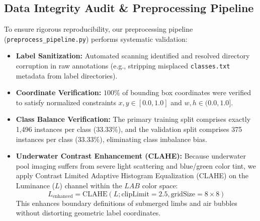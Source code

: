 \documentclass[a4paper,11pt]{article}
\begin{document}
\begin{table}[htbp]
\centering
\caption{Summary of Datasets and Surveillance Benchmark Scenarios}
\label{tab:datasets}
\end{table}

\subsection{Data Integrity Audit \& Preprocessing Pipeline}
To ensure rigorous reproducibility, our preprocessing pipeline (\texttt{preprocess\_pipeline.py}) performs systematic validation:
\begin{itemize}
    \item \textbf{Label Sanitization:} Automated scanning identified and resolved directory corruption in raw annotations (e.g., stripping misplaced \texttt{classes.txt} metadata from label directories).
    \item \textbf{Coordinate Verification:} $100\%$ of bounding box coordinates were verified to satisfy normalized constraints $x, y \in [0.0, 1.0]$ and $w, h \in (0.0, 1.0]$.
    \item \textbf{Class Balance Verification:} The primary training split comprises exactly 1,496 instances per class ($33.33\%$), and the validation split comprises 375 instances per class ($33.33\%$), eliminating class imbalance bias.
    \item \textbf{Underwater Contrast Enhancement (CLAHE):} Because underwater pool imaging suffers from severe light scattering and blue/green color tint, we apply Contrast Limited Adaptive Histogram Equalization (CLAHE) on the Luminance ($L$) channel within the $LAB$ color space:
    \begin{equation}
        L_{\text{enhanced}} = \text{CLAHE}(L; \text{clipLimit}=2.5, \text{gridSize}=8 \times 8)
    \end{equation}
    This enhances boundary definitions of submerged limbs and air bubbles without distorting geometric label coordinates.
\end{itemize}
\end{document}
